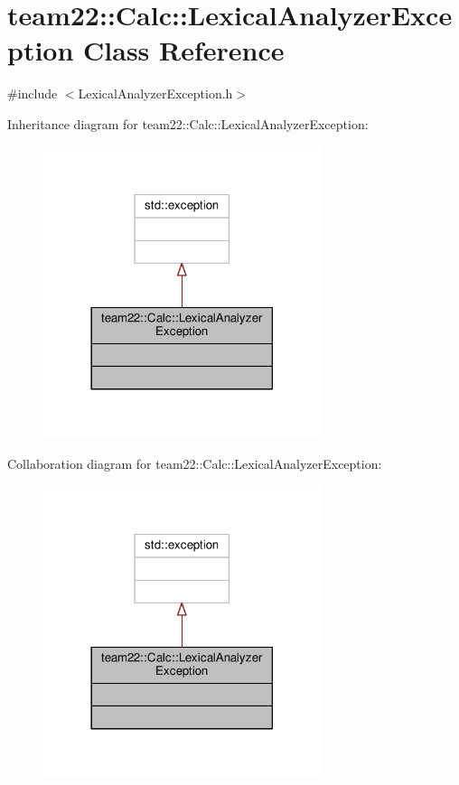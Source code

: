\hypertarget{classteam22_1_1_calc_1_1_lexical_analyzer_exception}{}\section{team22\+:\+:Calc\+:\+:Lexical\+Analyzer\+Exception Class Reference}
\label{classteam22_1_1_calc_1_1_lexical_analyzer_exception}


{\ttfamily \#include $<$Lexical\+Analyzer\+Exception.\+h$>$}



Inheritance diagram for team22\+:\+:Calc\+:\+:Lexical\+Analyzer\+Exception\+:
\nopagebreak
\begin{figure}[H]
\begin{center}
\leavevmode
\includegraphics[width=230pt]{classteam22_1_1_calc_1_1_lexical_analyzer_exception__inherit__graph}
\end{center}
\end{figure}


Collaboration diagram for team22\+:\+:Calc\+:\+:Lexical\+Analyzer\+Exception\+:
\nopagebreak
\begin{figure}[H]
\begin{center}
\leavevmode
\includegraphics[width=230pt]{classteam22_1_1_calc_1_1_lexical_analyzer_exception__coll__graph}
\end{center}
\end{figure}


